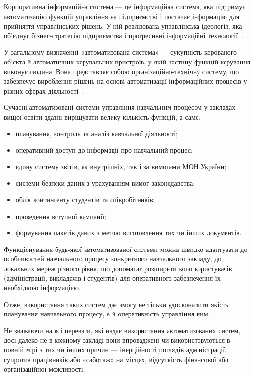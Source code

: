 \label{subsubs:KIS}

Корпоративна інформаційна система — це інформаційна система, яка підтримує автоматизацію функцій управління на підприємстві і постачає інформацію для прийняття управлінських рішень. У ній реалізована управлінська ідеологія, яка об'єднує бізнес-стратегію підприємства і прогресивні інформаційні технології~\cite{гужва2001інформаційні}.

У загальному визначенні «автоматизована система» — сукупність керованого об’єкта й автоматичних керувальних пристроїв, у якій частину функцій керування виконує людина. Вона представляє собою організаційно-технічну систему, що забезпечує вироблення рішень на основі автоматизації інформаційних процесів у різних сферах діяльності~\cite{гужва2001інформаційні}. 

Сучасні автоматизовані системи управління навчальним процесом у  закладах вищої освіти здатні вирішувати велику кількість функцій, а саме:
\begin{itemize}
	\item планування, контроль та аналіз навчальної діяльності;
	\item оперативний доступ до інформації про навчальний процес;
	\item єдину систему звітів, як внутрішніх, так і за вимогами МОН України;
	\item системи безпеки даних з урахуванням вимог законодавства;
	\item облік контингенту студентів та співробітників;
	\item проведення вступної кампанії;
	\item формування пакетів даних з метою виготовлення тих чи інших документів.
\end{itemize}

Функціонування будь-якої автоматизованої системи можна швидко адаптувати до особливостей навчального процесу конкретного навчального закладу, до локальних мереж різного рівня, що допомагає розширити коло користувачів (адміністрації, викладачів і студентів) для оперативного забезпечення їх необхідною інформацією. 

Отже, використання таких систем дає змогу не тільки удосконалити якість планування навчального процесу, а й оперативність управління ним.

Не зважаючи на всі переваги, які надає використання автоматизованих систем, досі далеко не в кожному закладі вони впроваджені чи використовуються в повній мірі з тих чи інших причин — інерційності поглядів адміністрації, супротив працівників або «саботаж» на місцях, відсутність фінансової або організаційної можливості.

